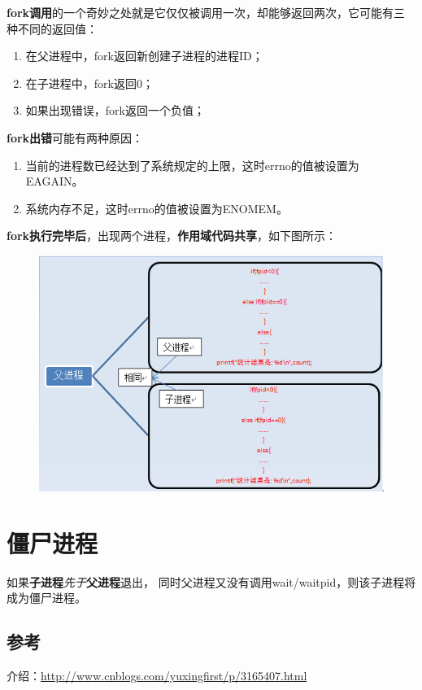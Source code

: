 \documentclass[UTF8,a4paper,8pt]{ctexbook}
\begin{document}
		\textbf{fork调用}的一个奇妙之处就是它仅仅被调用一次，却能够返回两次，它可能有三种不同的返回值： 
		\begin{enumerate}[itemindent = 2em]
			\item 在父进程中，fork返回新创建子进程的进程ID；
			\item 在子进程中，fork返回0；
			\item 如果出现错误，fork返回一个负值；
		\end{enumerate}
		
		\textbf{fork出错}可能有两种原因：
		\begin{enumerate}[itemindent = 2em]
			\item 当前的进程数已经达到了系统规定的上限，这时errno的值被设置为EAGAIN。
			\item 系统内存不足，这时errno的值被设置为ENOMEM。
		\end{enumerate} 
		 
		 \textbf{fork执行完毕后}，出现两个进程，\textbf{作用域代码共享}，如下图所示：
			 \begin{figure}[h]
			 	\centering
			 	\includegraphics[scale = 0.7]{fork.jpg}
			 \end{figure}
	\section{僵尸进程}
		如果\textbf{子进程}\textit{先于}\textbf{父进程}退出， 同时父进程又没有调用wait/waitpid，则该子进程将成为僵尸进程。
		
		\subsection{参考}
			介绍：\url{http://www.cnblogs.com/yuxingfirst/p/3165407.html}
			
\end{document}
